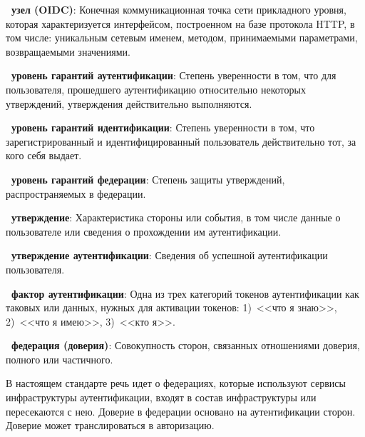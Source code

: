 {\bf \thedefctr~узел (OIDC)}:
Конечная коммуникационная точка сети прикладного уровня, которая характеризуется
интерфейсом, построенном на базе протокола HTTP,  в том числе: уникальным
сетевым именем, методом, принимаемыми параметрами, возвращаемыми значениями.


{\bf \thedefctr~уровень гарантий аутентификации}:
Степень уверенности в том, что для пользователя, прошедшего аутентификацию
относительно некоторых утверждений, утверждения действительно выполняются.


{\bf \thedefctr~уровень гарантий идентификации}:
Степень уверенности в том, что зарегистрированный и идентифицированный
пользователь действительно тот, за кого себя выдает.


{\bf \thedefctr~уровень гарантий федерации}:
Степень защиты утверждений, распространяемых в федерации.



{\bf \thedefctr~утверждение}:
Характеристика стороны или события, в том числе данные о пользователе или
сведения о прохождении им аутентификации.

{\bf \thedefctr~утверждение аутентификации}:
Сведения об успешной аутентификации пользователя.

{\bf \thedefctr~фактор аутентификации}:
Одна из трех категорий токенов аутентификации как таковых или данных, нужных для
активации токенов: 1)~<<что я знаю>>, 2)~<<что я имею>>, 3)~<<кто я>>.


{\bf \thedefctr~федерация (доверия)}:
Совокупность сторон, связанных отношениями доверия, полного или частичного.

\begin{note*}
В настоящем стандарте речь идет о федерациях, которые используют сервисы
инфраструктуры аутентификации, входят в состав инфраструктуры или пересекаются с
нею.
%
Доверие в федерации основано на аутентификации сторон. Доверие может
транслироваться в авторизацию.
\end{note*}

